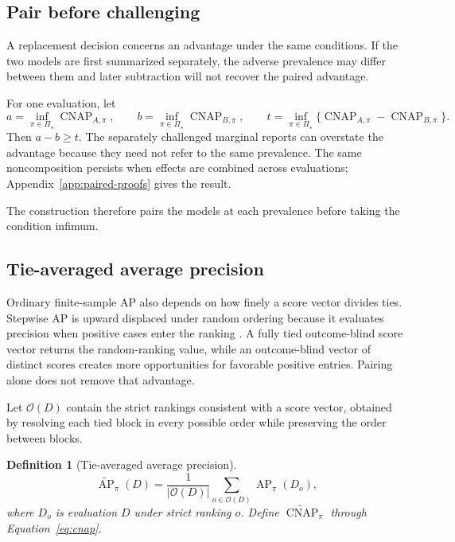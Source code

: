 \documentclass[11pt]{article}
\newcommand{\AP}{\operatorname{AP}}
\newcommand{\CNAP}{\operatorname{CNAP}}
\newcommand{\PSet}{\Pi_\star}
\newcommand{\APta}{\widetilde{\AP}}
\newcommand{\CNAPta}{\widetilde{\CNAP}}
\newtheorem{definition}{Definition}
\theoremstyle{remark}
\begin{document}
\subsection{Pair before challenging}

A replacement decision concerns an advantage under the same conditions. If
the two models are first summarized separately, the adverse prevalence may
differ between them and later subtraction will not recover the paired
advantage.

For one evaluation, let
\[
a=\inf_{\pi\in\PSet}\CNAP_{A,\pi},
\qquad
b=\inf_{\pi\in\PSet}\CNAP_{B,\pi},
\qquad
t=\inf_{\pi\in\PSet}
\{\CNAP_{A,\pi}-\CNAP_{B,\pi}\}.
\]
Then $a-b\geq t$. The separately challenged marginal reports can overstate the
advantage because they need not refer to the same prevalence. The same
noncomposition persists when effects are combined across evaluations;
Appendix~\ref{app:paired-proofs} gives the result.

The construction therefore pairs the models at each prevalence before taking
the condition infimum.

\subsection{Tie-averaged average precision}
\label{sec:tie-average}

Ordinary finite-sample AP also depends on how finely a score vector divides
ties. Stepwise AP is upward displaced under random ordering because it evaluates
precision when positive cases enter the ranking \cite{bestgen2015random}. A
fully tied outcome-blind score vector returns the random-ranking value, while
an outcome-blind vector of distinct scores creates more opportunities for
favorable positive entries. Pairing alone does not remove that advantage.

Let $\mathcal O(D)$ contain the strict rankings consistent with a score vector,
obtained by resolving each tied block in every possible order while preserving
the order between blocks.

\begin{definition}[Tie-averaged average precision]
\begin{equation}
\APta_\pi(D)
=
\frac{1}{|\mathcal O(D)|}
\sum_{o\in\mathcal O(D)}\AP_\pi(D_o),
\label{eq:tie-average}
\end{equation}
where $D_o$ is evaluation $D$ under strict ranking $o$. Define
$\CNAPta_\pi$ through Equation~\eqref{eq:cnap}.
\end{definition}
\end{document}
